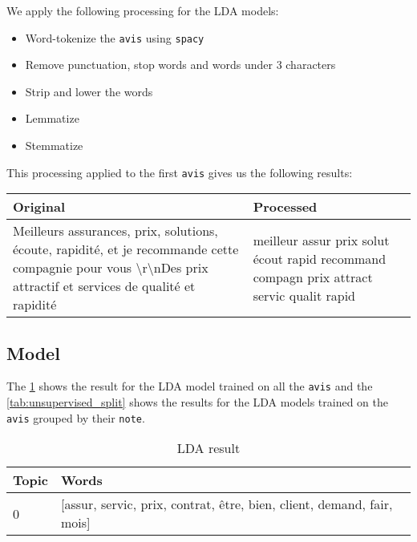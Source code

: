 \documentclass[a4paper, 12pt, one column]{article}
\begin{document}
We apply the following processing for the LDA models:
\begin{itemize}
    \item Word-tokenize the \lstinline{avis} using \lstinline{spacy}
    \item Remove punctuation, stop words and words under 3 characters
    \item Strip and lower the words
    \item Lemmatize
    \item Stemmatize
\end{itemize}

This processing applied to the first \lstinline{avis} gives us the following results:

\begin{table}[H]
\centering
\begin{tabular}{|p{7cm}|p{7cm}|}
\hline
\textbf{Original} &
  \textbf{Processed} \\ \hline
Meilleurs assurances, prix, solutions, écoute, rapidité, et je recommande cette compagnie pour vous \textbackslash{}r\textbackslash{}nDes prix attractif et services de qualité et rapidité  &
  meilleur assur prix solut écout rapid recommand compagn prix attract servic qualit rapid \\ \hline
\end{tabular}
\end{table}

\newpage
\subsection{Model}

The \cref{tab:unsupervised} shows the result for the LDA model trained on all the \lstinline{avis} and the \cref{tab:unsupervised_split} shows the results for the LDA models trained on the \lstinline{avis} grouped by their \lstinline{note}.

\begin{table}[H]
\centering
\begin{tabular}{|p{1cm}|p{13cm}|}
\hline
 \textbf{Topic} &                                                                  \textbf{Words} \\
\hline
     0 & [assur, servic, prix, contrat, être, bien, client, demand, fair, mois] \\
\hline
\end{tabular}
\label{tab:unsupervised}
\caption{LDA result}
\end{table}
\end{document}
